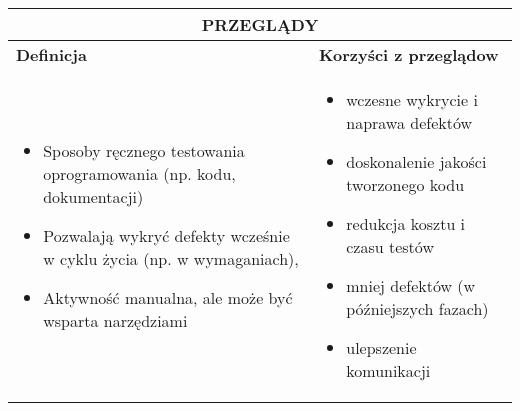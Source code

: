 \documentclass[../main.tex]{subfiles}
\begin{document}
    \begin{table}[H]
        \begin{center}
            \begin{tabular}{| p{8cm}| p{8cm}|}
                \hline
                \multicolumn{2}{|c|}{ \textbf{PRZEGLĄDY}}\\
                \hline
                \textbf{Definicja} & \textbf{Korzyści z przeglądow}\\
                \hline
                \begin{itemize}
                    \item Sposoby ręcznego testowania oprogramowania (np. kodu, dokumentacji)
                    \item Pozwalają wykryć defekty wcześnie w cyklu życia (np. w wymaganiach),
                    \item Aktywność manualna, ale może być wsparta narzędziami
                \end{itemize}
                &
                \begin{itemize}
                    \item wczesne wykrycie i naprawa defektów
                    \item doskonalenie jakości tworzonego kodu
                    \item redukcja kosztu i czasu testów
                    \item mniej defektów (w późniejszych fazach)
                    \item ulepszenie komunikacji
                \end{itemize}\\
                \hline
            \end{tabular}
        \end{center}
    \end{table}
\end{document}
